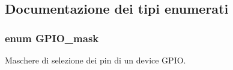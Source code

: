 \subsection{Documentazione dei tipi enumerati}
\hypertarget{group___g_p_i_o_ga6d5aef8a8a54ee2f602d47252ff66595}{
\subsubsection[{G\+P\+I\+O\+\_\+mask}]{\setlength{\rightskip}{0pt plus 5cm}enum {\bf G\+P\+I\+O\+\_\+mask}}}\label{group___g_p_i_o_ga6d5aef8a8a54ee2f602d47252ff66595}


Maschere di selezione dei pin di un device G\+P\+I\+O. 


